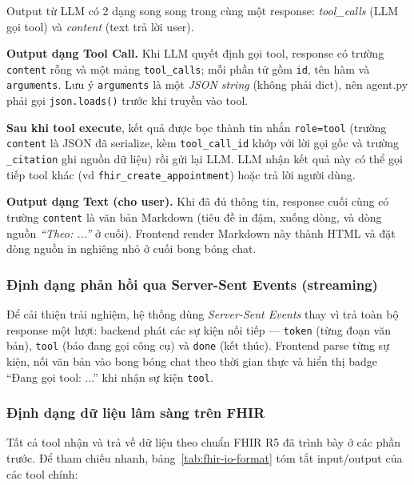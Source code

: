 \documentclass[a4paper,13pt,3p,oneside]{report}
\theoremstyle{definition}
\theoremstyle{remark}
\theoremstyle{definition}
\begin{document}
Output từ LLM có 2 dạng song song trong cùng một response: \textit{tool\_calls} (LLM gọi tool) và \textit{content} (text trả lời user).

\textbf{Output dạng Tool Call.} Khi LLM quyết định gọi tool, response có trường \texttt{content} rỗng và một mảng \texttt{tool\_calls}; mỗi phần tử gồm \texttt{id}, tên hàm và \texttt{arguments}. Lưu ý \texttt{arguments} là một \textit{JSON string} (không phải dict), nên agent.py phải gọi \texttt{json.loads()} trước khi truyền vào tool.

\textbf{Sau khi tool execute}, kết quả được bọc thành tin nhắn \texttt{role=tool} (trường \texttt{content} là JSON đã serialize, kèm \texttt{tool\_call\_id} khớp với lời gọi gốc và trường \texttt{\_citation} ghi nguồn dữ liệu) rồi gửi lại LLM. LLM nhận kết quả này có thể gọi tiếp tool khác (vd \texttt{fhir\_create\_appointment}) hoặc trả lời người dùng.

\textbf{Output dạng Text (cho user).} Khi đã đủ thông tin, response cuối cùng có trường \texttt{content} là văn bản Markdown (tiêu đề in đậm, xuống dòng, và dòng nguồn \textit{``Theo: ...''} ở cuối). Frontend render Markdown này thành HTML và đặt dòng nguồn in nghiêng nhỏ ở cuối bong bóng chat.

\subsubsection{Định dạng phản hồi qua Server-Sent Events (streaming)}

Để cải thiện trải nghiệm, hệ thống dùng \textit{Server-Sent Events} thay vì trả toàn bộ response một lượt: backend phát các sự kiện nối tiếp --- \texttt{token} (từng đoạn văn bản), \texttt{tool} (báo đang gọi công cụ) và \texttt{done} (kết thúc). Frontend parse từng sự kiện, nối văn bản vào bong bóng chat theo thời gian thực và hiển thị badge ``Đang gọi tool: ...'' khi nhận sự kiện \texttt{tool}.

\subsubsection{Định dạng dữ liệu lâm sàng trên FHIR}

Tất cả tool nhận và trả về dữ liệu theo chuẩn FHIR R5 đã trình bày ở các phần trước. Để tham chiếu nhanh, bảng~\ref{tab:fhir-io-format} tóm tắt input/output của các tool chính:
\end{document}
